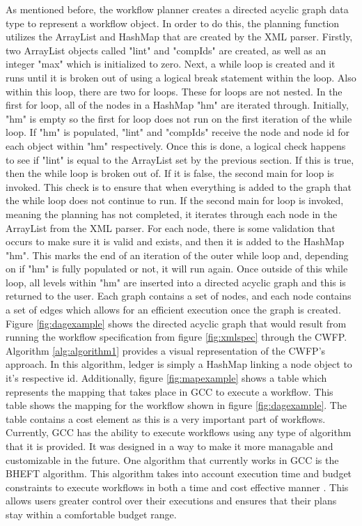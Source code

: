 \documentclass[fleqn,10pt]{SelfArx} %
\begin{document}
As mentioned before, the workflow planner creates a directed acyclic graph data type to represent a workflow object. In order to do this, the planning function utilizes the ArrayList and HashMap that are created by the XML parser. Firstly, two ArrayList objects called "lint" and "compIds" are created, as well as an integer "max" which is initialized to zero. Next, a while loop is created and it runs until it is broken out of using a logical break statement within the loop. Also within this loop, there are two for loops. These for loops are not nested. In the first for loop, all of the nodes in a HashMap "hm" are iterated through. Initially, "hm" is empty so the first for loop does not run on the first iteration of the while loop. If "hm" is populated, "lint" and "compIds" receive the node and node id for each object within "hm" respectively. Once this is done, a logical check happens to see if "lint" is equal to the ArrayList set by the previous section. If this is true, then the while loop is broken out of. If it is false, the second main for loop is invoked. This check is to ensure that when everything is added to the graph that the while loop does not continue to run. If the second main for loop is invoked, meaning the planning has not completed, it iterates through each node in the ArrayList from the XML parser. For each node, there is some validation that occurs to make sure it is valid and exists, and then it is added to the HashMap "hm". This marks the end of an iteration of the outer while loop and, depending on if "hm" is fully populated or not, it will run again. Once outside of this while loop, all levels within "hm" are inserted into a directed acyclic graph and this is returned to the user. Each graph contains a set of nodes, and each node contains a set of edges which allows for an efficient execution once the graph is created. Figure \ref{fig:dagexample} shows the directed acyclic graph that would result from running the workflow specification from figure \ref{fig:xmlspec} through the CWFP. Algorithm \ref{alg:algorithm1} provides a visual representation of the CWFP's approach. In this algorithm, ledger is simply a HashMap linking a node object to it's respective id. Additionally, figure \ref{fig:mapexample} shows a table which represents the mapping that takes place in GCC to execute a workflow. This table shows the mapping for the workflow shown in figure \ref{fig:dagexample}. The table contains a cost element as this is a very important part of workflows. Currently, GCC has the ability to execute workflows using any type of algorithm that it is provided. It was designed in a way to make it more managable and customizable in the future. One algorithm that currently works in GCC is the BHEFT algorithm. This algorithm takes into account execution time and budget constraints to execute workflows in both a time and cost effective manner \cite{verma2015cost}. This allows users greater control over their executions and ensures that their plans stay within a comfortable budget range.
\end{document}
